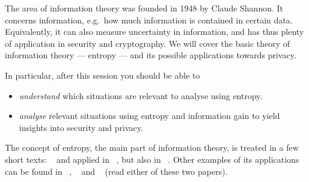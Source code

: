 The area of information theory was founded in 1948 by Claude Shannon.
It concerns information, e.g.\ how much information is contained in certain 
data.
Equivalently, it can also measure uncertainty in information, and has thus 
plenty of application in security and cryptography.
We will cover the basic theory of information theory --- entropy --- and its 
possible applications towards privacy.

In particular, after this session you should be able to
\begin{itemize}
  \item \emph{understand} which situations are relevant to analyse using 
    entropy.
  \item \emph{analyse} relevant situations using entropy and information gain 
    to yield insights into security and privacy.
\end{itemize}

The concept of entropy, the main part of information theory, is treated in 
a few short texts:
~\cite{Eckersley2010apo}
and applied in
~\cite{Eckersley2010hui},
but also in
~\cite{Ueltschi2013se}.
Other examples of its applications can be found in
~\cite{Komanduri2011opa},
~\cite{MeasuringAnonymity} and
~\cite{InfoTheoreticMetricForAnonymity} 
(read either of these two papers).

